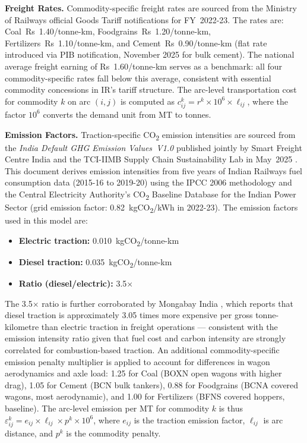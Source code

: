 \documentclass[11pt, a4paper]{article}
\numberwithin{equation}{section}
\numberwithin{figure}{section}
\numberwithin{table}{section}
\begin{document}
\textbf{Freight Rates.} Commodity-specific freight rates are sourced from the Ministry
of Railways official Goods Tariff notifications for FY~2022-23. The rates are:
Coal~Rs~1.40/tonne-km, Foodgrains~Rs~1.20/tonne-km, Fertilizers~Rs~1.10/tonne-km, and
Cement~Rs~0.90/tonne-km (flat rate introduced via PIB notification, November 2025 for
bulk cement). The national average freight earning of Rs~1.60/tonne-km
\cite{iryearbook2023} serves as a benchmark: all four commodity-specific rates fall
below this average, consistent with essential commodity concessions in IR's tariff
structure. The arc-level transportation cost for commodity $k$ on arc $(i,j)$ is
computed as $c^k_{ij} = r^k \times 10^6 \times \ell_{ij}$, where the factor $10^6$
converts the demand unit from MT to tonnes.

\textbf{Emission Factors.} Traction-specific CO\textsubscript{2} emission intensities
are sourced from the \textit{India Default GHG Emission Values~V1.0} published jointly
by Smart Freight Centre India and the TCI-IIMB Supply Chain Sustainability Lab in
May~2025 \cite{sfcindia2025}. This document derives emission intensities from five
years of Indian Railways fuel consumption data (2015-16 to 2019-20) using the IPCC 2006
methodology and the Central Electricity Authority's CO\textsubscript{2} Baseline
Database for the Indian Power Sector (grid emission factor: 0.82~kgCO\textsubscript{2}/kWh
in 2022-23). The emission factors used in this model are:

\begin{itemize}
    \item \textbf{Electric traction:} 0.010~kgCO\textsubscript{2}/tonne-km
    \item \textbf{Diesel traction:} 0.035~kgCO\textsubscript{2}/tonne-km
    \item \textbf{Ratio (diesel/electric):} 3.5$\times$
\end{itemize}

The 3.5$\times$ ratio is further corroborated by Mongabay India \cite{mongabay2025},
which reports that diesel traction is approximately 3.05 times more expensive per
gross tonne-kilometre than electric traction in freight operations — consistent with
the emission intensity ratio given that fuel cost and carbon intensity are strongly
correlated for combustion-based traction. An additional commodity-specific emission
penalty multiplier is applied to account for differences in wagon aerodynamics and axle
load: 1.25 for Coal (BOXN open wagons with higher drag), 1.05 for Cement (BCN bulk
tankers), 0.88 for Foodgrains (BCNA covered wagons, most aerodynamic), and 1.00 for
Fertilizers (BFNS covered hoppers, baseline). The arc-level emission per MT for
commodity $k$ is thus $\varepsilon^k_{ij} = e_{ij} \times \ell_{ij} \times p^k \times
10^6$, where $e_{ij}$ is the traction emission factor, $\ell_{ij}$ is arc distance, and
$p^k$ is the commodity penalty.
\end{document}
